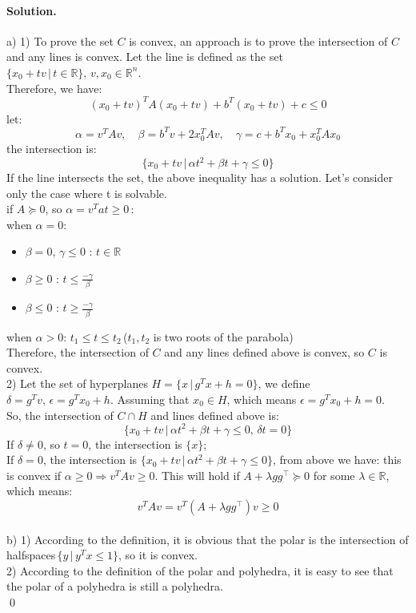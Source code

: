 \documentclass[a4paper]{article}
\newenvironment{solution}
{\color{blue} \paragraph{Solution.}}
{\newline \qed}
\begin{document}
\begin{solution}
    a) 1) To prove the set $C$ is convex, an approach is to prove the intersection of $C$ and any lines is convex. Let the line is defined as the set $\{x_0 + tv\,|\,t \in \mathbb{R}\},\,v,x_0 \in \mathbb{R}^n$.\\Therefore, we have:
    $$(x_0+tv)^TA(x_0+tv)+b^T(x_0+tv)+c \leq 0$$
let: $$\alpha=v^TAv,\quad\beta=b^Tv+2x_0^TAv,\quad\gamma=c+b^Tx_0+x_0^TAx_0$$
the intersection is: $$\{x_0+tv\,|\,\alpha t^2+\beta t+\gamma \leq 0\}$$ 
If the line intersects the set, the above inequality has a solution. Let's consider only the case where t is solvable.\\
if $A \succeq 0$, so $\alpha=v^Tat \geq 0$\,:\\
when $\alpha = 0$:
\begin{itemize}
    \item $\beta = 0,\,\gamma \leq 0$ : $t \in \mathbb{R}$
    \item $\beta \geq 0$ :  $t \leq \frac{-\gamma}{\beta}$
    \item $\beta \leq 0$ :  $t \geq	 \frac{-\gamma}{\beta}$
\end{itemize}
when $\alpha>0$:  $t_1 \leq t  \leq t_2$\,($t_1,t_2$ is two roots of the parabola)\\
Therefore, the intersection of $C$ and any lines defined above is convex, so $C$ is convex.\\
2) Let the set of hyperplanes $H=\{x\,|\,g^Tx+h=0\}$, we define $\delta=g^Tv,\,\epsilon=g^Tx_0+h$. Assuming that $x_0 \in H$, which means $\epsilon=g^Tx_0+h=0$.\\ So, the intersection of $C\cap H$ and lines defined above is: $$\{x_0+tv\,|\,\alpha t^2+\beta t+\gamma \leq 0,\,\delta t = 0\}$$ If $\delta\not = 0$, so $t=0$, the intersection is $\{x\}$;\\If $\delta = 0$, the intersection is $\{x_0+tv\,|\,\alpha t^2+\beta t+\gamma \leq 0\}$, from above we have: this is convex if $\alpha \geq 0 \Rightarrow v^TAv \geq 0$. This will hold if $A+\lambda gg^\top \succeq 0$ for some $\lambda \in \mathbb{R}$, which means: $$v^TAv=v^T(A+\lambda gg^\top)v \geq 0$$ 
\\b) 1) According to the definition, it is obvious that the polar is the intersection of halfspaces\,$\{y\,|\,y^Tx \leq 1\}$, so it is convex.\\
2) According to the definition of the polar and polyhedra, it is easy to see that the polar of a polyhedra is still a polyhedra.\\

\end{solution}
\end{document}
